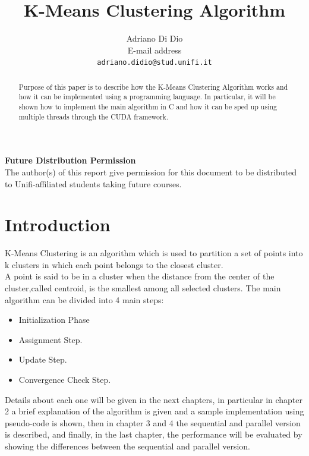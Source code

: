\documentclass[10pt,twocolumn,letterpaper]{article}
\begin{document}
\title{K-Means Clustering Algorithm}

\author{Adriano Di Dio\\
E-mail address\\
{\tt\small adriano.didio@stud.unifi.it}
}

\maketitle
\thispagestyle{empty}

\begin{abstract}
Purpose of this paper is to describe how the K-Means Clustering Algorithm works and how it can be implemented using a 
programming language.\newline
In particular, it will be shown how to implement the main algorithm in C and how it can be sped up using multiple threads through the 
CUDA framework.
\end{abstract}

\noindent\large\textbf{Future Distribution Permission}\\
\indent The author(s) of this report give permission for this document to be distributed to Unifi-affiliated students taking future courses.

\section{Introduction}
K-Means Clustering is an algorithm which is used to partition a set of points into k clusters in which each point belongs to the closest 
cluster.\\
A point is said to be in a cluster when the distance from the center of the cluster,called centroid, is the smallest among all selected 
clusters.\newline
The main algorithm can be divided into 4 main steps:
\begin{itemize}
  \item Initialization Phase
  \item Assignment Step.
  \item Update Step.
  \item Convergence Check Step.
\end{itemize}
Details about each one will be given in the next chapters, in particular in chapter 2 a brief explanation of the algorithm is 
given and a sample implementation using pseudo-code is shown, then in chapter 3 and 4 the sequential and parallel version is 
described, and finally, in the last chapter, the performance will be evaluated by showing the differences between the 
sequential and parallel version.\newline
\end{document}

